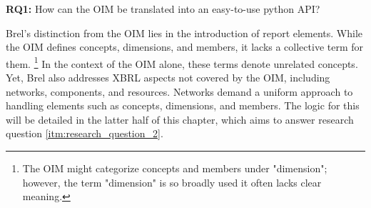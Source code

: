 \begin{displayquote}
    \textbf{RQ1:} How can the OIM be translated into an easy-to-use python API?
\end{displayquote}

Brel's distinction from the OIM lies in the introduction of report elements.
While the OIM defines concepts, dimensions, and members, it lacks a collective term for them.
\footnote{The OIM might categorize concepts and members under "dimension"; however, the term "dimension" is so broadly used it often lacks clear meaning.}
In the context of the OIM alone, these terms denote unrelated concepts.
Yet, Brel also addresses XBRL aspects not covered by the OIM, including networks, components, and resources.
Networks demand a uniform approach to handling elements such as concepts, dimensions, and members.
The logic for this will be detailed in the latter half of this chapter, which aims to answer research question \ref{itm:research_question_2}.



